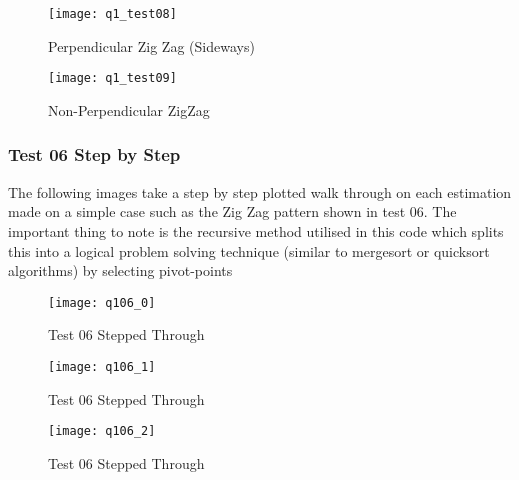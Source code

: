 			\begin{figure}[position = here]
				\begin{centering}
					\texttt{[image: q1\_test08]}\\
					\caption[\textit{RPYAxes}]{Perpendicular Zig Zag (Sideways)}
				\end{centering}
			\end{figure}
			\newline			
			
			\begin{figure}[position = here]
				\begin{centering}
					\texttt{[image: q1\_test09]}\\
					\caption[\textit{RPYAxes}]{Non-Perpendicular ZigZag}
				\end{centering}
			\end{figure}
			\newline			
			
			\pagebreak
		\subsubsection{Test 06 Step by Step}
		The following images take a step by step plotted walk through on each estimation made on a simple case such as the Zig Zag pattern shown in test 06. The important thing to note is the recursive method utilised in this code which splits this into a logical problem solving technique (similar to mergesort or quicksort algorithms) by selecting pivot-points 
			\begin{figure}[position = here]
				\begin{centering}
					\texttt{[image: q106\_0]}\\
					\caption[\textit{RPYAxes}]{Test 06 Stepped Through}
				\end{centering}
			\end{figure}
			\newline			
			
			\begin{figure}[position = here]
				\begin{centering}
					\texttt{[image: q106\_1]}\\
					\caption[\textit{RPYAxes}]{Test 06 Stepped Through}
				\end{centering}
			\end{figure}
			\newline						

			\begin{figure}[position = here]
				\begin{centering}
					\texttt{[image: q106\_2]}\\
					\caption[\textit{RPYAxes}]{Test 06 Stepped Through}
				\end{centering}
			\end{figure}
			\newline			
		
